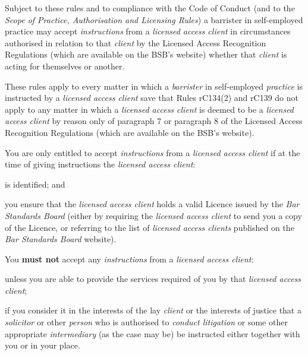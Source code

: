 
Subject to these rules and to compliance with the Code of Conduct (and
to the \emph{Scope of Practice, Authorisation and Licensing Rules}) a
barrister in self-employed practice may accept \emph{instructions} from
a \emph{licensed access client} in circumstances authorised in relation
to that \emph{client} by the Licensed Access Recognition Regulations
(which are available on the BSB's website) whether that \emph{client} is
acting for themselves or another.


These rules apply to every matter in which a \emph{barrister} in
self-employed \emph{practice} is instructed by a \emph{licensed access
client} save that Rules rC134(2) and rC139 do not apply to any matter in
which a \emph{licensed access client} is deemed to be a \emph{licensed
access client} by reason only of paragraph 7 or paragraph 8 of the
Licensed Access Recognition Regulations (which are available on the
BSB's website).


You are only entitled to accept \emph{instructions} from a
\emph{licensed access client} if at the time of giving instructions the
\emph{licensed access client}:
\begin{numlist}\item is identified; and
\item you ensure that the \emph{licensed access client} holds a valid
Licence issued by the \emph{Bar Standards Board} (either by requiring
the \emph{licensed access client} to send you a copy of the Licence, or
referring to the list of \emph{licensed access clients} published on the
\emph{Bar Standards Board} website).
\end{numlist}

You \textcolor{myred}{\textbf{must not}} accept any \emph{instructions} from a \emph{licensed access
client}:
\begin{numlist}\item unless you are able to provide the services required of you by that
\emph{licensed access client};
\item if you consider it in the interests of the lay \emph{client} or the
interests of justice that a \emph{solicitor} or other \emph{person} who
is authorised to \emph{conduct litigation} or some other appropriate
\emph{intermediary} (as the case may be) be instructed either together
with you or in your place.
\end{numlist}

